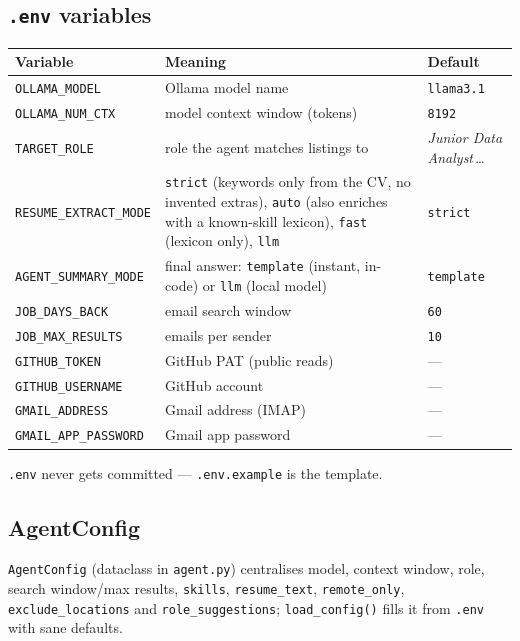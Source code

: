 \documentclass[11pt,a4paper]{article}
\newcommand{\file}[1]{\texttt{\small #1}}
\newcommand{\tool}[1]{\texttt{#1}}
\begin{document}
\subsection{\file{.env} variables}
\begin{center}
\begin{tabular}{@{}lll@{}}
\toprule
\textbf{Variable} & \textbf{Meaning} & \textbf{Default}\\
\midrule
\file{OLLAMA\_MODEL} & Ollama model name & \file{llama3.1}\\
\file{OLLAMA\_NUM\_CTX} & model context window (tokens) & \file{8192}\\
\file{TARGET\_ROLE} & role the agent matches listings to & \emph{Junior Data Analyst}\,…\\
\file{RESUME\_EXTRACT\_MODE} & \file{strict} (keywords only from the CV, no invented extras), \file{auto} (also enriches with a known-skill lexicon), \file{fast} (lexicon only), \file{llm} & \file{strict}\\
\file{AGENT\_SUMMARY\_MODE} & final answer: \file{template} (instant, in-code) or \file{llm} (local model) & \file{template}\\
\file{JOB\_DAYS\_BACK} & email search window & \file{60}\\
\file{JOB\_MAX\_RESULTS} & emails per sender & \file{10}\\
\file{GITHUB\_TOKEN} & GitHub PAT (public reads) & ---\\
\file{GITHUB\_USERNAME} & GitHub account & ---\\
\file{GMAIL\_ADDRESS} & Gmail address (IMAP) & ---\\
\file{GMAIL\_APP\_PASSWORD} & Gmail app password & ---\\
\bottomrule
\end{tabular}
\end{center}

\verb|.env| never gets committed — \file{.env.example} is the template.

\subsection{AgentConfig}
\tool{AgentConfig} (dataclass in \file{agent.py}) centralises model, context
window, role, search window/max results, \tool{skills}, \tool{resume\_text},
\tool{remote\_only}, \tool{exclude\_locations} and \tool{role\_suggestions};
\tool{load\_config()} fills it from \file{.env} with sane defaults.

\end{document}
